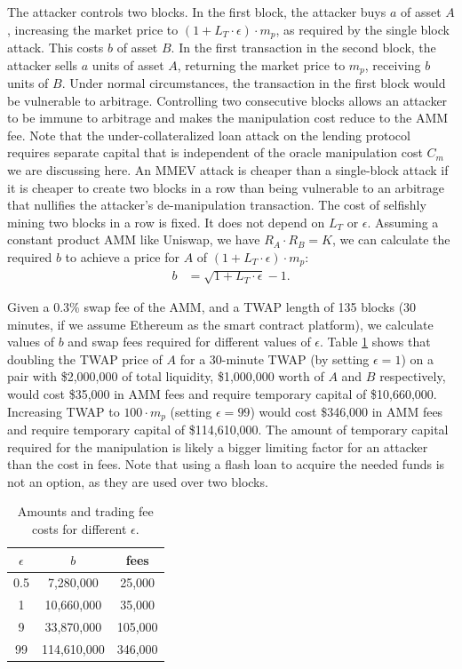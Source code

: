 \documentclass[conference]{IEEEtran}
\begin{document}
The attacker controls two blocks. In the first block, the attacker buys $a$ of asset $A$, increasing the market price to $(1 + L_T \cdot \epsilon) \cdot m_p$, as required by the single block attack. This costs $b$ of asset $B$. In the first transaction in the second block, the attacker sells $a$ units of asset $A$, returning the market price to $m_p$, receiving $b$ units of $B$. Under normal circumstances, the transaction in the first block would be vulnerable to arbitrage. Controlling two consecutive blocks allows an attacker to be immune to arbitrage and makes the manipulation cost reduce to the AMM fee. Note that the under-collateralized loan attack on the lending protocol requires separate capital that is independent of the oracle manipulation cost $C_m$ we are discussing here. An MMEV attack is cheaper than a single-block attack if it is cheaper to create two blocks in a row than being vulnerable to an arbitrage that nullifies the attacker's de-manipulation transaction. The cost of selfishly mining two blocks in a row is fixed. It does not depend on $L_T$ or $\epsilon$. Assuming a constant product AMM like Uniswap, we have $R_A \cdot R_B = K$, we can calculate the required $b$ to achieve a price for $A$ of $(1 + L_T \cdot \epsilon)\cdot m_p$:
\begin{align*}
    b &= \sqrt{1 + L_T \cdot \epsilon}-1.
\end{align*}

Given a 0.3\% swap fee of the AMM, and a TWAP length of 135 blocks (30 minutes, if we assume Ethereum as the smart contract platform), we calculate values of $b$ and swap fees required for different values of $\epsilon$. Table \ref{TableCosts} shows that doubling the TWAP price of $A$ for a 30-minute TWAP (by setting $\epsilon = 1$) on a pair with \$2,000,000 of total liquidity, \$1,000,000 worth of $A$ and $B$ respectively, would cost \$35,000 in AMM fees and require temporary capital of \$10,660,000. Increasing TWAP to $100 \cdot m_p$ (setting $\epsilon = 99$) would cost \$346,000 in AMM fees and require temporary capital of \$114,610,000. The amount of temporary capital required for the manipulation is likely a bigger limiting factor for an attacker than the cost in fees. Note that using a flash loan to acquire the needed funds is not an option, as they are used over two blocks.

\begin{table}[ht]

\begin{center}
 \begin{tabular}{|c |c| c|} 
 \hline
 $\epsilon$ & $b$ & fees\\ [0.5ex] 
 \hline\hline
 0.5 & 7,280,000 & 25,000 \\ 
 \hline
 1 & 10,660,000 & 35,000 \\ 
 \hline
 9 & 33,870,000 & 105,000 \\ 
 \hline
 99 & 114,610,000 & 346,000 \\  
 \hline
\end{tabular}
\end{center}
\caption{Amounts and trading fee costs for different $\epsilon$.}
\label{TableCosts}
\end{table}
\end{document}
